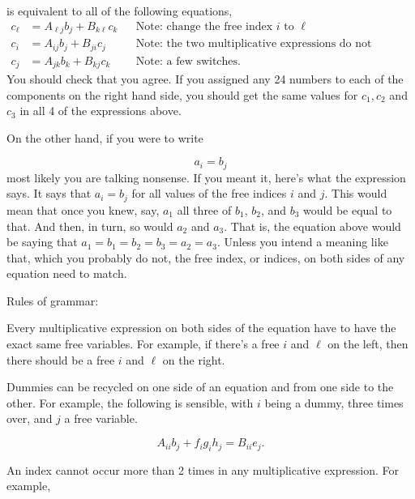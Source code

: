 \documentclass[11pt]{article}
\begin{document}
\begin{enumerate}
 is equivalent to all of the following equations, 
 \begin{align*}
 c_\ell &= A_{\ell j}b_j  + B_{k\ell}c_k&&\mbox{Note: change the free index $i$ to $\ell$}\\
  c_i &= A_{ij}b_j  + B_{ji}c_j &&\mbox{Note: the two multiplicative expressions do not interact}\\
   c_j &= A_{jk}b_k  + B_{kj}c_k&&\mbox{Note: a few switches.}
 \end{align*}
You should check that you agree. If you assigned any 24 numbers to each of the components on the right hand side, you should get the same values for $c_1, c_2$ and $c_3$ in all 4 of the expressions above.
 
 
 \par\medskip
 
On the other hand, if you were to write
 
 \[  
 a_i = b_j
 \]
 most likely you are talking nonsense.  If you meant it, here's what the expression says.  It says that $a_i= b_j$ for all values 
 of the free indices $i$ and $j$.  This would mean that once you knew, say, $a_1$  all  three of $b_1$, $b_2$, and $b_3$ would be equal to that.  And then, in turn, so would $a_2$ and $a_3$.   That is, the equation above would be saying that $a_1=b_1=b_2=b_3=a_2=a_3$. Unless you intend a meaning like that, which you probably do not, the free index, or indices, on both sides of any equation need to match. 
 
 \par\medskip
Rules of grammar:
 
 \begin{description}
 
 
 \item Every multiplicative expression on both sides of the equation have to have the exact same free variables. For example, if there's a free $i$ and $\ell$ on the left, then there should be a free $i$ and $\ell$ on the right.
 
 \item  Dummies can be recycled on one side of an equation and from one side to the other. For example, the following is sensible, with $i$ being a dummy, three times over, and $j$ a free variable.
 
 \[
 A_{ii}b_j  +  f_ig_ih_j  =   B_{ii}e_j .  
 \]
 
 \item An index cannot occur more than 2 times in any multiplicative expression. For example, 
 

\end{description}
\end{enumerate}
\end{document}
